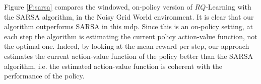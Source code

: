 Figure \ref{F:sarsa} compares the windowed, on-policy version of $RQ$-Learning with the SARSA algorithm, in the Noisy Grid World environment. It is clear that our algorithm outperforms SARSA in this \gls{mdp}.
Since this is an on-policy setting, at each step the algorithm is estimating the current policy action-value function, not the optimal one. Indeed, by looking at the mean reward per step, our approach estimates the current action-value function of the policy better than the SARSA algorithm, i.e. the estimated action-value function is coherent with the performance of the policy.
